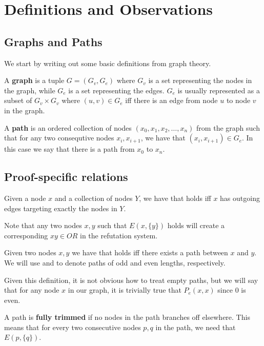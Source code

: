 \section{Definitions and Observations}
\label{sec:Definitions and Observations}
\subsection{Graphs and Paths}
\label{sub:Graphs and Paths}
We start by writing out some basic definitions from graph theory.
\begin{definition}
  A \textbf{graph} is a tuple $G = (G_v, G_e)$ where $G_v$ is a set representing the nodes in the graph, while $G_e$ is a set representing the edges.  $G_e$ is usually represented as a subset of $G_v \times G_v$ where $(u,v) \in G_e$ iff there is an edge from node $u$ to node $v$ in the graph.
\end{definition}
\begin{definition}
  A \textbf{path} is an ordered collection of nodes $(x_0, x_1, x_2, \dots, x_n)$ from the graph such that for any two consequtive nodes $x_i,x_{i+1}$, we have that $(x_i, x_{i+1}) \in G_e$.
  In this case we say that there is a path from $x_0$ to $x_n$.
\end{definition}
\subsection{Proof-specific relations}
\label{sub:Proof-specific relations}
\begin{definition}
  Given a node $x$ and a collection of nodes $Y$, we have that  holds iff $x$ has outgoing edges targeting exactly the nodes in $Y$.
\end{definition}
Note that any two nodes $x,y$ such that $E(x,\{y\})$ holds will create a corresponding $xy \in OR$ in the refutation system.
\begin{definition}
  Given two nodes $x,y$ we have that  holds iff there exists a path between $x$ and $y$.
  We will use  and  to denote paths of odd and even lengths, respectively.
\end{definition}
  Given this definition, it is not obvious how to treat empty paths, but we will say that for any node $x$ in our graph, it is trivially true that $P_e(x,x)$ since $0$ is even.
\begin{definition}
  A path is \textbf{fully trimmed} if no nodes in the path branches off elsewhere.
  This means that for every two consecutive nodes $p,q$ in the path, we need that $E(p,\{q\})$.
\end{definition}

